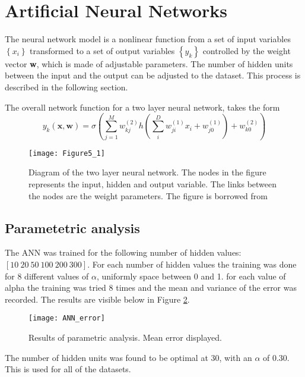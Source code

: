 \section*{Artificial Neural Networks}

The neural network model is a nonlinear function from a set of input variables $ \left\lbrace x_i \right\rbrace  $ transformed to a set of output variables $ \left\lbrace y_k \right\rbrace  $ controlled by the weight vector \textbf{w}, which is made of adjustable parameters.
The number of hidden units between the input and the output can be adjusted to the dataset.
This process is described in the following section.

The overall network function for a two layer neural network, takes the form
\begin{equation}
y_k(\mathbf{x},\mathbf{w}) = \sigma \left( \sum_{j=1}^{M} w_{kj}^{(2)} h\left( \sum_{i}^{D} w_{ji}^{(1)} x_i + w_{j0}^{(1)} \right) + w_{k0}^{(2)} \right) 
\label{eq:ANN_overall_rap}
\end{equation}
 
\begin{figure}[H]
	\centering
	\texttt{[image: Figure5\_1]}
	\caption{Diagram of the two layer neural network. The nodes in the figure represents the input, hidden and output variable. The links between the nodes are the weight parameters. The figure is borrowed from \cite{bishop2007}} 
	\label{fig:ANN_fig_theory}
\end{figure}

\subsection*{Parametetric analysis}
The ANN was trained for the following number of hidden values: $ [10\ 20\ 50\ 100\ 200\ 300] $.
For each number of hidden values the training was done for $ 8 $ different values of $ \alpha $, uniformly space between 0 and 1.
for each value of alpha the training was tried 8 times and the mean and variance of the error was recorded. The results are visible below in Figure \ref{fig:ANN_error}.

\begin{figure}[H]
\centering
\texttt{[image: ANN\_error]}
\caption{Results of parametric analysis. Mean error displayed.}
\label{fig:ANN_error}
\end{figure}

The number of hidden units was found to be optimal at 30, with an $ \alpha $ of 0.30. This is used for all of the datasets.

